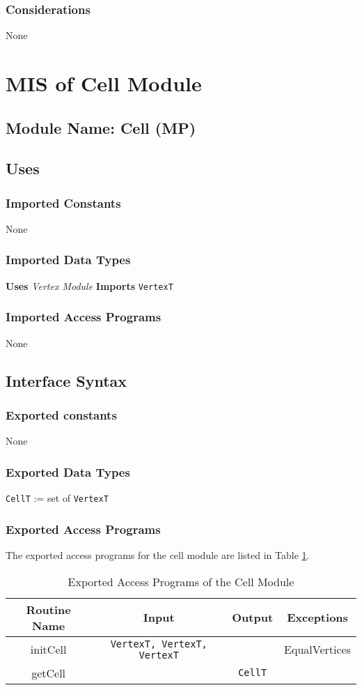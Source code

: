 \documentclass[12pt,titlepage]{article}
\begin{document}
\subsubsection{Considerations} None



\section{MIS of Cell Module \label{AmisSecC}}

\subsection{Module Name: Cell (MP)}

\subsection{Uses}
\subsubsection{Imported Constants} None
\subsubsection{Imported Data Types} 
{\bf Uses}  \emph{Vertex Module}  {\bf Imports}  \texttt{VertexT}  
\subsubsection{Imported Access Programs}None

\subsection{Interface Syntax}
\subsubsection{Exported constants} None
\subsubsection{Exported Data Types}
{\tt CellT} := set of {\tt VertexT}
\subsubsection{Exported Access Programs}
The exported access programs for the cell module are listed in Table \ref{AmisCEAP}.
\begin{table}[htbp]
\centering
\begin{tabular}{|c|c|c|c|}
\hline
Routine Name & Input & Output & Exceptions \\ 
\hline
initCell & {\tt VertexT, VertexT, VertexT} & & EqualVertices\\
\hline
getCell &  & {\tt CellT} & \\
\hline
\end{tabular}
\caption{Exported Access Programs of the Cell Module}
\label{AmisCEAP} 
\end{table}
\end{document}
